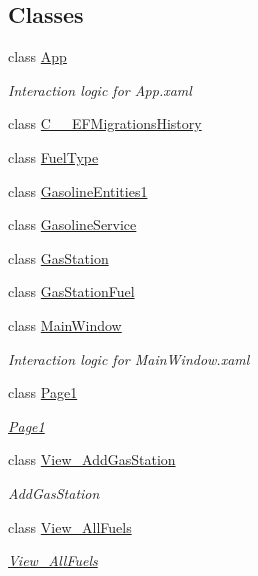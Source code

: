 \subsection*{Classes}
\begin{DoxyCompactItemize}
\item 
class \mbox{\hyperlink{class_gasoline_desktop_1_1_app}{App}}
\begin{DoxyCompactList}\small\item\em Interaction logic for App.\+xaml \end{DoxyCompactList}\item 
class \mbox{\hyperlink{class_gasoline_desktop_1_1_c_____e_f_migrations_history}{C\+\_\+\+\_\+\+E\+F\+Migrations\+History}}
\item 
class \mbox{\hyperlink{class_gasoline_desktop_1_1_fuel_type}{Fuel\+Type}}
\item 
class \mbox{\hyperlink{class_gasoline_desktop_1_1_gasoline_entities1}{Gasoline\+Entities1}}
\item 
class \mbox{\hyperlink{class_gasoline_desktop_1_1_gasoline_service}{Gasoline\+Service}}
\item 
class \mbox{\hyperlink{class_gasoline_desktop_1_1_gas_station}{Gas\+Station}}
\item 
class \mbox{\hyperlink{class_gasoline_desktop_1_1_gas_station_fuel}{Gas\+Station\+Fuel}}
\item 
class \mbox{\hyperlink{class_gasoline_desktop_1_1_main_window}{Main\+Window}}
\begin{DoxyCompactList}\small\item\em Interaction logic for Main\+Window.\+xaml \end{DoxyCompactList}\item 
class \mbox{\hyperlink{class_gasoline_desktop_1_1_page1}{Page1}}
\begin{DoxyCompactList}\small\item\em \mbox{\hyperlink{class_gasoline_desktop_1_1_page1}{Page1}} \end{DoxyCompactList}\item 
class \mbox{\hyperlink{class_gasoline_desktop_1_1_view___add_gas_station}{View\+\_\+\+Add\+Gas\+Station}}
\begin{DoxyCompactList}\small\item\em Add\+Gas\+Station \end{DoxyCompactList}\item 
class \mbox{\hyperlink{class_gasoline_desktop_1_1_view___all_fuels}{View\+\_\+\+All\+Fuels}}
\begin{DoxyCompactList}\small\item\em \mbox{\hyperlink{class_gasoline_desktop_1_1_view___all_fuels}{View\+\_\+\+All\+Fuels}} \end{DoxyCompactList}\item 

\end{DoxyCompactItemize}
